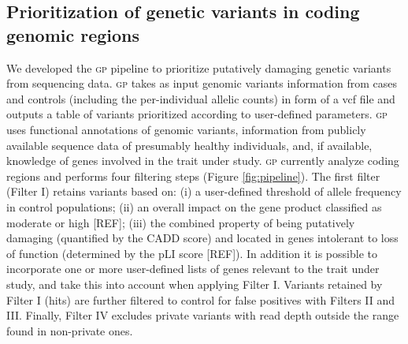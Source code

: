 \documentclass[fleqn,10pt]{wlscirep}
\newcommand{\gp}[]{\textsc{gp }}
\begin{document}
\subsection*{Prioritization of genetic variants in coding genomic regions} 
We developed the \gp pipeline to prioritize putatively damaging genetic variants from sequencing data. \gp takes as input genomic variants information from cases and controls (including the per-individual allelic counts) in form of a vcf file and outputs a table of variants prioritized according to user-defined parameters. \gp uses functional annotations of genomic variants, information from publicly available sequence data of presumably healthy individuals, and, if available, knowledge of genes involved in the trait under study. \gp currently analyze coding regions and performs four filtering steps (Figure \ref{fig:pipeline}). The first filter (Filter I) retains variants based on: (i) a user-defined threshold of allele frequency in control populations; (ii) an overall impact on the gene product classified as moderate or high [REF]; (iii) the combined property of being putatively damaging (quantified by the CADD score\cite{rentzsch2019cadd}) and located in genes intolerant to loss of function (determined by the pLI score [REF]). In addition it is possible to incorporate one or more user-defined lists of genes relevant to the trait under study, and take this into account when applying Filter I. Variants retained by Filter I (hits) are further filtered to control for false positives with Filters II and III. Finally, Filter IV excludes private variants with read depth outside the range found in non-private ones.   

\end{document}
